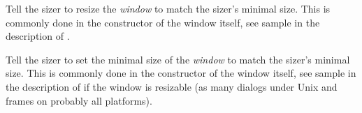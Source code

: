 
Tell the sizer to resize the {\it window} to match the sizer's minimal size. This
is commonly done in the constructor of the window itself, see sample in the description
of .

\label{wxsizersetsizehints}


Tell the sizer to set the minimal size of the {\it window} to match the sizer's minimal size. 
This is commonly done in the constructor of the window itself, see sample in the description
of  if the window is resizable (as many dialogs under Unix and
frames on probably all platforms).

